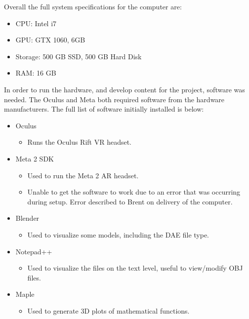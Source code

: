     Overall the full system specifications for the computer are:

    \begin{itemize}
        \item CPU: Intel i7
        \item GPU: GTX 1060, 6GB
        \item Storage: 500 GB SSD, 500 GB Hard Disk
        \item RAM: 16 GB
    \end{itemize}

    In order to run the hardware, and develop content for the project, software was needed.  The Oculus and Meta both required software from the hardware manufacturers.  The full list of software initially installed is below:

    \begin{itemize}
        \item Oculus
        \begin{itemize}
            \item Runs the Oculus Rift VR headset.
        \end{itemize}
        \item Meta 2 SDK
        \begin{itemize}
            \item Used to run the Meta 2 AR headset.
            \item Unable to get the software to work due to an error that was occurring during setup.  Error described to Brent on delivery of the computer.
        \end{itemize}
        \item Blender
        \begin{itemize}
            \item Used to visualize some models, including the DAE file type.
        \end{itemize}
        \item Notepad++
        \begin{itemize}
            \item Used to visualize the files on the text level, useful to view/modify OBJ files.
        \end{itemize}
        \item Maple
        \begin{itemize}
            \item Used to generate 3D plots of mathematical functions.
        \end{itemize}
    \end{itemize}

